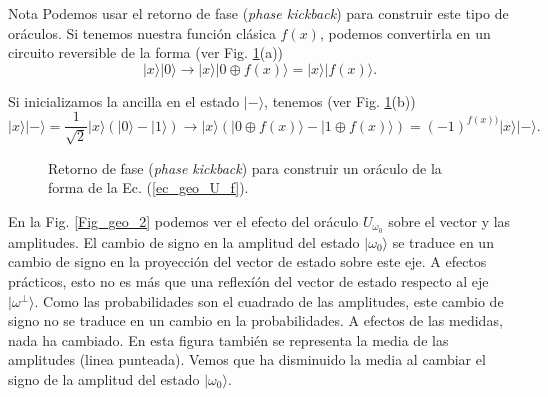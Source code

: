 \documentclass[a4paper,11pt]{article} %
\numberwithin{equation}{section}
\def\lp{\left(}
\def\rp{\right)}
\begin{document}
	\begin{mybox}{Nota}
	Podemos usar el retorno de fase (\textit{phase kickback}) para construir este tipo de oráculos. 
	Si tenemos nuestra función clásica $f(x)$,   podemos convertirla en un circuito reversible de la 
	forma (ver Fig. \ref{Fig_geo_phase_kick}(a))
	\begin{equation*}
	|x \rangle |0 \rangle \rightarrow |x \rangle | 0 \oplus f(x) \rangle  = |x \rangle | f(x) \rangle .
	\end{equation*}

	Si inicializamos la ancilla en el estado $| -\rangle$, tenemos (ver Fig. \ref{Fig_geo_phase_kick}(b))
	\begin{equation*}
	|x \rangle |- \rangle = \frac{1}{\sqrt{2}} |x \rangle \lp | 0 \rangle - | 1 \rangle \rp 
	\rightarrow 
	|x \rangle \lp | 0 \oplus f(x) \rangle - | 1 \oplus f(x) \rangle  \rp = (-1)^{f(x))} |x \rangle |- \rangle .
	\end{equation*} \vspace{-0.8cm}
	\begin{figure}[H] \setcounter{subfigure}{0}
	\centering
	\caption{Retorno de fase (\textit{phase kickback}) para construir un oráculo de la forma de la 
	Ec. (\ref{ec_geo_U_f}). }
	\label{Fig_geo_phase_kick}
	\end{figure}

	\end{mybox}

En la Fig. \ref{Fig_geo_2} podemos ver el efecto del oráculo $U_{\omega_0}$ sobre el vector y las amplitudes. El cambio de signo en la amplitud del estado $| \omega_0 \rangle$ se traduce en un cambio de signo en la proyección del vector de estado sobre este eje. A efectos prácticos, esto no es más que una reflexíón del vector de estado respecto al eje $| \omega^{\perp} \rangle$. Como las probabilidades son el cuadrado de las amplitudes, este cambio de signo no se traduce en un cambio en la probabilidades. A efectos de las medidas, nada ha cambiado. En esta figura también se representa la media de las amplitudes (linea punteada). Vemos que ha disminuido la media al cambiar el signo de la amplitud del estado $| \omega_0 \rangle$. 
\end{document}
